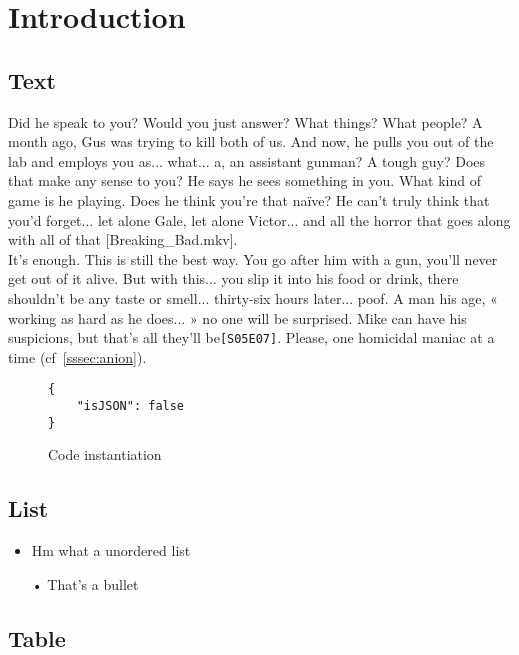 
\chapter{Introduction}

	\section{Text}

Did he speak to you? Would you just answer? What things? What people? A month ago, Gus was trying to kill both of us. And now, he pulls you out of the lab and employs you as... what... a, an assistant gunman? A tough guy? Does that make any sense to you? He says he sees something in you. What kind of game is he playing. Does he think you're that naïve? He can't truly think that you'd forget... let alone Gale, let alone Victor... and all the horror that goes along with all of that [Breaking\_Bad.mkv]. \\


It's enough. This is still the best way. You go after him with a gun, you'll never get out of it alive. But with this... you slip it into his food or drink, there shouldn't be any taste or smell... thirty-six hours later... poof. A man his age, « working as hard as he does... » no one will be surprised. Mike can have his suspicions, but that's all they'll be\verb![S05E07]!. Please, one homicidal maniac at a time (cf~\ref{sssec:anion}).\\

\begin{figure}[!h]
\centering
\begin{BVerbatim}
{
	"isJSON": false
}
\end{BVerbatim}
\centering
\caption{Code instantiation}
\end{figure}

	\section{List}

\begin{itemize}[label=\textbullet,font=\color{black}]
\item Hm what a unordered list
\item[•] That's a bullet
\end{itemize}


	\section{Table}


